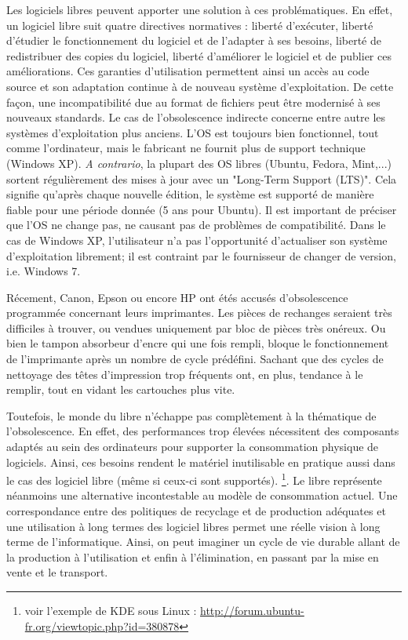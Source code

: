 \documentclass[10pt]{../fiche}
\begin{document}
Les logiciels libres peuvent apporter une solution à ces problématiques. En effet, un logiciel libre suit quatre directives normatives : liberté d'exécuter, liberté d'étudier le fonctionnement du logiciel et de l'adapter à ses besoins, liberté de redistribuer des copies du logiciel, liberté d'améliorer le logiciel et de publier ces améliorations. Ces garanties d'utilisation permettent ainsi un accès au code source et son adaptation continue à de nouveau système d'exploitation. De cette façon, une incompatibilité due au format de fichiers peut être modernisé à ses nouveaux standards. Le cas de l'obsolescence indirecte concerne entre autre les systèmes d'exploitation plus anciens. L'OS est toujours bien fonctionnel, tout comme l'ordinateur, mais le fabricant ne fournit plus de support technique (\textsf{Windows XP}). \textit{A contrario}, la plupart des OS libres (\textsf{Ubuntu, Fedora, Mint,...}) sortent régulièrement des mises à jour avec un "Long-Term Support (LTS)". Cela signifie qu'après chaque nouvelle édition, le système est supporté de manière fiable pour une période donnée (5 ans pour \textsf{Ubuntu}). Il est important de préciser que l'OS ne change pas, ne causant pas de problèmes de compatibilité. Dans le cas de \textsf{Windows XP}, l'utilisateur n'a pas l'opportunité d'actualiser son système d'exploitation librement; il est contraint par le fournisseur de changer de version, i.e. \textsf{Windows 7}.

Récement, Canon, Epson ou encore HP ont étés accusés d'obsolescence programmée concernant leurs imprimantes. Les pièces de rechanges seraient très difficiles à trouver, ou vendues uniquement par bloc de pièces très onéreux. Ou bien le tampon absorbeur d'encre qui une fois rempli, bloque le fonctionnement de l'imprimante après un nombre de cycle prédéfini. Sachant que des cycles de nettoyage des têtes d'impression trop fréquents ont, en plus, tendance à le remplir, tout en vidant les cartouches plus vite.

Toutefois, le monde du libre n'échappe pas complètement à la thématique de l'obsolescence. En effet, des performances trop élevées nécessitent des composants adaptés au sein des ordinateurs pour supporter la consommation physique de logiciels. Ainsi, ces besoins rendent le matériel inutilisable en pratique aussi dans le cas des logiciel libre (même si ceux-ci sont supportés). \footnote{voir l'exemple de \textsf{KDE} sous \textsf{Linux} : \url{http://forum.ubuntu-fr.org/viewtopic.php?id=380878}}. Le libre représente néanmoins une alternative incontestable au modèle de consommation actuel. Une correspondance entre des politiques de recyclage et de production adéquates et une utilisation à long termes des logiciel libres permet une réelle vision à long terme de l'informatique. Ainsi, on peut imaginer un cycle de vie durable allant de la production à l'utilisation et enfin à l'élimination, en passant par la mise en vente et le transport.
\end{document}
